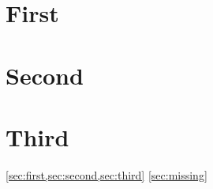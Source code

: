 \documentclass{article}
\begin{document}
\section{First}\label{sec:first}
\section{Second}\label{sec:second}
\section{Third}\label{sec:third}
\cref{sec:first,sec:second,sec:third}
\cref{sec:missing}
\end{document}
